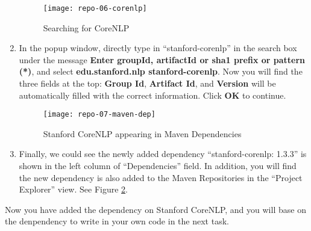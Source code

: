 \begin{enumerate}
\begin{figure}[t]
\centering
\texttt{[image: repo-06-corenlp]}
\caption{Searching for CoreNLP\label{repo-06-corenlp}}
\end{figure}

\item In the popup window, directly type in ``stanford-corenlp'' in the search
box under the message \textbf{Enter groupId, artifactId or sha1 prefix or
pattern (*)}, and select \textbf{edu.stanford.nlp stanford-corenlp}. Now you
will find the three fields at the top: \textbf{Group Id}, \textbf{Artifact Id},
and \textbf{Version} will be automatically filled with the correct information.
Click \textbf{OK} to continue.

\begin{figure}[t]
\centering
\texttt{[image: repo-07-maven-dep]}
\caption{Stanford CoreNLP appearing in Maven Dependencies\label{repo-07-maven-dep}}
\end{figure}

\item Finally, we could see the newly added dependency ``stanford-corenlp:
1.3.3'' is shown in the left column of ``Dependencies'' field. In addition, you
will find the new dependency is also added to the Maven Repositories in the
``Project Explorer'' view. See Figure \ref{repo-07-maven-dep}.

\end{enumerate}

Now you have added the dependency on Stanford CoreNLP, and you will base on the
denpendency to write in your own code in the next task.
